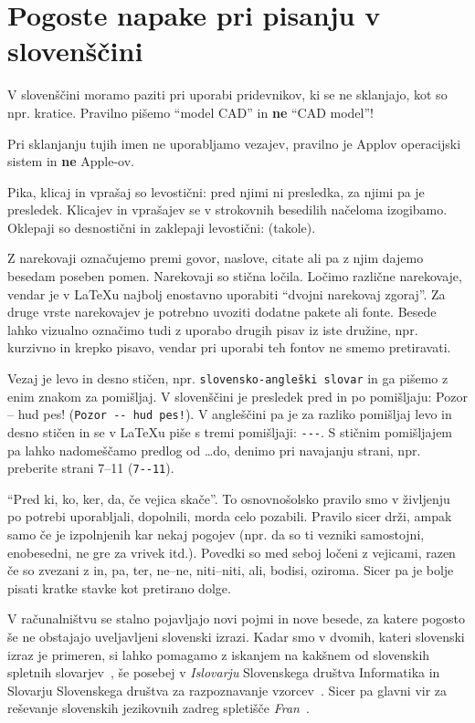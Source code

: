 \documentclass[a4paper,12pt,openright]{book}
\begin{document}
\chapter{Pogoste napake pri pisanju v slovenščini}  %
\label{slo}

V slovenščini moramo paziti  pri uporabi pridevnikov, ki se ne sklanjajo, kot so npr. kratice. 
Pravilno pišemo ``model CAD'' in \textbf{ne} ``CAD model''!

Pri sklanjanju tujih imen ne uporabljamo vezajev, pravilno je Applov operacijski sistem in \textbf{ne} Apple-ov.

Pika, klicaj in vprašaj so levostični: pred njimi ni presledka, za njimi pa je presledek. 
Klicajev in vprašajev se v strokovnih besedilih načeloma izogibamo. Oklepaji so desnostični in zaklepaji levostični: (takole).

Z narekovaji označujemo premi govor, naslove, citate ali pa z njim dajemo besedam poseben pomen. Narekovaji so stična ločila. Ločimo različne narekovaje, vendar je v
\LaTeX u najbolj enostavno uporabiti ``dvojni narekovaj zgoraj''. Za druge vrste narekovajev je potrebno uvoziti dodatne pakete ali fonte.
Besede lahko vizualno označimo tudi z uporabo drugih pisav  iz iste družine, npr. 
kurzivno in krepko pisavo, vendar pri uporabi teh fontov ne smemo pretiravati.

Vezaj  je levo in desno stičen, npr. \verb=slovensko-angleški slovar= in ga pišemo z enim znakom za pomišljaj.
V slovenščini je presledek pred in po pomišljaju: Pozor -- hud pes! (\verb=Pozor -- hud pes!=).
V angleščini pa je za razliko pomišljaj levo in desno stičen in se v \LaTeX u piše s tremi  pomišljaji: \verb=---=.
S stičnim pomišljajem pa lahko nadomeščamo predlog od \dots do, denimo pri navajanju strani, npr. preberite strani 7--11 (\verb=7--11=).

``Pred ki, ko, ker, da, če vejica skače''. 
To osnovnošolsko pravilo smo v življenju po potrebi uporabljali, dopolnili, morda celo pozabili. 
Pravilo sicer drži, ampak samo če je izpolnjenih kar nekaj pogojev (npr. da so ti vezniki samostojni, enobesedni, ne gre za vrivek itd.).
Povedki so med seboj ločeni z vejicami, razen če so zvezani z in, pa, ter, ne–ne, niti–niti, ali, bodisi, oziroma.
Sicer pa je bolje pisati kratke stavke kot pretirano dolge.

V računalništvu se stalno pojavljajo novi pojmi in nove besede, za katere pogosto še ne obstajajo uveljavljeni slovenski izrazi.
Kadar smo v dvomih, kateri slovenski izraz je primeren, si lahko pomagamo z iskanjem na kakšnem od slovenskih spletnih slovarjev~\cite{slovarji}, še posebej v
\textit{Islovarju} Slovenskega društva Informatika \cite{Islovar} in Slovarju Slovenskega društva za razpoznavanje vzorcev~\cite{sdrv}.
Sicer pa glavni vir za reševanje slovenskih jezikovnih zadreg spletišče \textit{Fran}~\cite{fran}.
\end{document}
